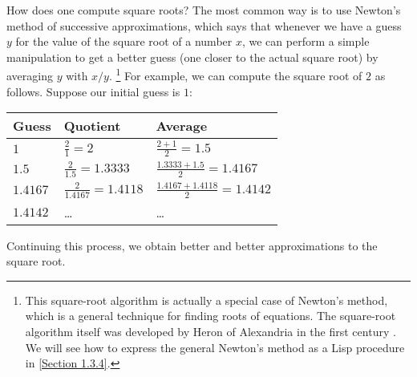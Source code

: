 How does one compute square roots?
The most common way is to use Newton’s method of successive approximations, which says that whenever we have a guess \( y \) for the value of the square root of a number \( x \), we can perform a simple manipulation to get a better guess (one closer to the actual square root) by averaging \( y \) with \( x / y \).%
\footnote{
	This square-root algorithm is actually a special case of Newton’s method, which is a general technique for finding roots of equations.
	The square-root algorithm itself was developed by Heron of Alexandria in the first century .
	We will see how to express the general Newton’s method as a Lisp procedure in \cref{Section 1.3.4}.
}
For example, we can compute the square root of \( 2 \) as follows.
Suppose our initial guess is \( 1 \):
\begin{center}
	\begingroup
	\renewcommand{\arraystretch}{2}
	\begin{tabular}{l>{\quad}l>{\quad}l}
		Guess        & Quotient                        & Average                                  \\
		\midrule
		\( 1 \)      & \( \frac{2}{1} = 2 \)           & \( \frac{2 + 1}{2} = 1.5 \)              \\
		\( 1.5 \)    & \( \frac{2}{1.5} = 1.3333 \)    & \( \frac{1.3333 + 1.5}{2} = 1.4167 \)    \\
		\( 1.4167 \) & \( \frac{2}{1.4167} = 1.4118 \) & \( \frac{1.4167 + 1.4118}{2} = 1.4142 \) \\
		\( 1.4142 \) & …                           & …
	\end{tabular}
	\endgroup
\end{center}
Continuing this process, we obtain better and better approximations to the square root.

